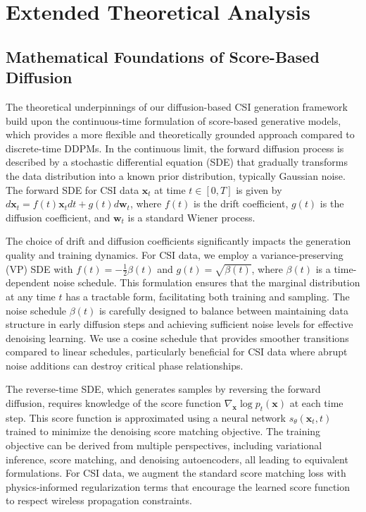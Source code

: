 \documentclass[journal]{IEEEtran}
\begin{document}



\section{Extended Theoretical Analysis}

\subsection{Mathematical Foundations of Score-Based Diffusion}

The theoretical underpinnings of our diffusion-based CSI generation framework build upon the continuous-time formulation of score-based generative models, which provides a more flexible and theoretically grounded approach compared to discrete-time DDPMs. In the continuous limit, the forward diffusion process is described by a stochastic differential equation (SDE) that gradually transforms the data distribution into a known prior distribution, typically Gaussian noise. The forward SDE for CSI data $\mathbf{x}_t$ at time $t \in [0, T]$ is given by $d\mathbf{x}_t = f(t)\mathbf{x}_t dt + g(t)d\mathbf{w}_t$, where $f(t)$ is the drift coefficient, $g(t)$ is the diffusion coefficient, and $\mathbf{w}_t$ is a standard Wiener process.

The choice of drift and diffusion coefficients significantly impacts the generation quality and training dynamics. For CSI data, we employ a variance-preserving (VP) SDE with $f(t) = -\frac{1}{2}\beta(t)$ and $g(t) = \sqrt{\beta(t)}$, where $\beta(t)$ is a time-dependent noise schedule. This formulation ensures that the marginal distribution at any time $t$ has a tractable form, facilitating both training and sampling. The noise schedule $\beta(t)$ is carefully designed to balance between maintaining data structure in early diffusion steps and achieving sufficient noise levels for effective denoising learning. We use a cosine schedule that provides smoother transitions compared to linear schedules, particularly beneficial for CSI data where abrupt noise additions can destroy critical phase relationships.

The reverse-time SDE, which generates samples by reversing the forward diffusion, requires knowledge of the score function $\nabla_{\mathbf{x}} \log p_t(\mathbf{x})$ at each time step. This score function is approximated using a neural network $s_{\theta}(\mathbf{x}_t, t)$ trained to minimize the denoising score matching objective. The training objective can be derived from multiple perspectives, including variational inference, score matching, and denoising autoencoders, all leading to equivalent formulations. For CSI data, we augment the standard score matching loss with physics-informed regularization terms that encourage the learned score function to respect wireless propagation constraints.
\end{document}
